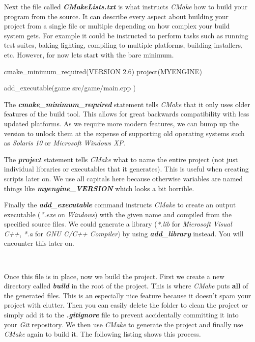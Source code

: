 \documentclass[10pt]{article}
\begin{document}
Next the file called \textbf{\textit{CMakeLists.txt}} is what instructs
\textit{CMake} how to build your program from the source.  It can describe
every aspect about building your project from a single file or multiple
depending on how complex your build system gets. For example it could be
instructed to perform tasks such as running test suites, baking lighting,
compiling to multiple platforms, building installers, etc. However, for now lets start with the bare minimum.

\begin{Code}
  cmake_minimum_required(VERSION 2.6)
  project(MYENGINE)

  add_executable(game
    src/game/main.cpp
  )
\end{Code}

The \textbf{\textit{cmake\_minimum\_required}} statement tells
\textit{CMake} that it only uses older features of the build tool. This
allows for great backwards compatibility with less updated platforms. As
we require more modern features, we can bump up the version to unlock them
at the expense of supporting old operating systems such as \textit{Solaris
10} or \textit{Microsoft Windows XP}.

The \textbf{\textit{project}} statement tells \textit{CMake} what to
name the entire project (not just individual libraries or executables
that it generates). This is useful when creating scripts later on. We
use all capitals here because otherwise variables are named things like
\textbf{\textit{myengine\_VERSION}} which looks a bit horrible.

Finally the \textbf{\textit{add\_executable}} command instructs
\textit{CMake} to create an output executable (\textit{*.exe}
on \textit{Windows}) with the given name and compiled from the
specified source files. We could generate a library (\textit{*.lib}
for \textit{Microsoft Visual C++}, \textit{*.a} for \textit{GNU C/C++ Compiler})
by using \textbf{\textit{add\_library}} instead. You will encounter this
later on.

\

Once this file is in place, now we build the project. First we create
a new directory called \textbf{\textit{build}} in the root of the
project.  This is where \textit{CMake} puts \textbf{all} of the generated
files. This is an especially nice feature because it doesn't spam
your project with clutter.  Then you can easily delete the folder to
clean the project or simply add it to the \textbf{\textit{.gitignore}}
file to prevent accidentally committing it into your \textit{Git}
repository. We then use \textit{CMake} to generate the project and
finally use \textit{CMake} again to build it. The following listing
shows this process.
\end{document}
